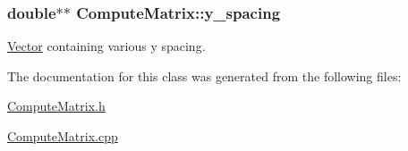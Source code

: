\hypertarget{class_compute_matrix_a1b6929ee0703c5394e8af381ff870012}{}
\subsubsection[{y\+\_\+spacing}]{\setlength{\rightskip}{0pt plus 5cm}double$\ast$$\ast$ Compute\+Matrix\+::y\+\_\+spacing\hspace{0.3cm}{\ttfamily [private]}}\label{class_compute_matrix_a1b6929ee0703c5394e8af381ff870012}


\hyperlink{class_vector}{Vector} containing various y spacing. 



The documentation for this class was generated from the following files\+:\begin{DoxyCompactItemize}
\item 
\hyperlink{_compute_matrix_8h}{Compute\+Matrix.\+h}\item 
\hyperlink{_compute_matrix_8cpp}{Compute\+Matrix.\+cpp}\end{DoxyCompactItemize}
